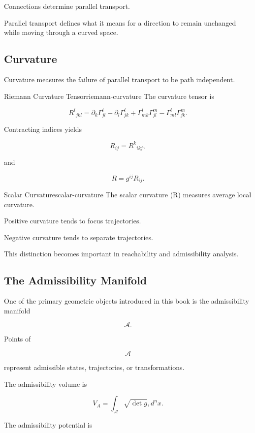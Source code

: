 \documentclass[12pt,twoside,openright]{book}
\begin{document}
Connections determine parallel transport.

Parallel transport defines what it means for a direction
to remain unchanged while moving through a curved space.

\subsection{Curvature}

Curvature measures the failure of parallel transport to be
path independent.
\begin{definition}{Riemann Curvature Tensor}{riemann-curvature}
The curvature tensor is

\[
R^i{}_{jkl}
=
\partial_k\Gamma^i_{jl}
-
\partial_l\Gamma^i_{jk}
+
\Gamma^i_{mk}\Gamma^m_{jl}
-
\Gamma^i_{ml}\Gamma^m_{jk}.
\]
\end{definition}

Contracting indices yields

\[
R_{ij}
=
R^k{}_{ikj},
\]

and

\[
R
=
g^{ij}R_{ij}.
\]

\begin{definition}{Scalar Curvature}{scalar-curvature}
The scalar curvature (R) measures average local
curvature.
\end{definition}

Positive curvature tends to focus trajectories.

Negative curvature tends to separate trajectories.

This distinction becomes important in reachability and
admissibility analysis.

\subsection{The Admissibility Manifold}

One of the primary geometric objects introduced in this
book is the admissibility manifold

\[
\mathcal A.
\]

Points of

\[
\mathcal A
\]

represent admissible states, trajectories, or
transformations.

The admissibility volume is

\[
V_A
=

\int_{\mathcal A}
\sqrt{\det g}
,d^nx.
\]

The admissibility potential is
\end{document}
